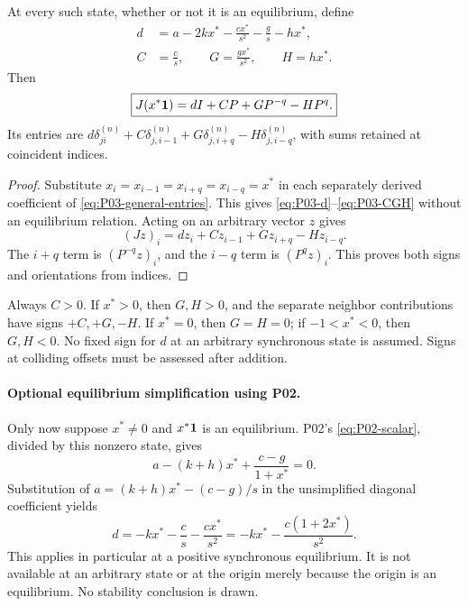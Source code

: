\begin{proposition}
\label{prop:P03-homogeneous}
At every such state, whether or not it is an equilibrium, define
\begin{align}
 d&=a-2kx^*-\frac{c x^*}{s^2}-\frac{g}{s}-h x^*,
       \label{eq:P03-d}\\
 C&=\frac{c}{s},\qquad G=\frac{g x^*}{s^2},\qquad H=h x^*.
       \label{eq:P03-CGH}
\end{align}
Then
\begin{equation}
 \boxed{J(x^*\mathbf{1})=dI+CP+GP^{-q}-HP^q.}
 \label{eq:P03-homogeneous}
\end{equation}
Its entries are
$d\delta^{(n)}_{ji}+C\delta^{(n)}_{j,i-1}
+G\delta^{(n)}_{j,i+q}-H\delta^{(n)}_{j,i-q}$,
with sums retained at coincident indices.
\end{proposition}
\begin{proof}
Substitute $x_i=x_{i-1}=x_{i+q}=x_{i-q}=x^*$ in each separately
 derived coefficient of \eqref{eq:P03-general-entries}. This gives
\eqref{eq:P03-d}--\eqref{eq:P03-CGH} without an equilibrium relation.
Acting on an arbitrary vector $z$ gives
\[
 (Jz)_i=d z_i+C z_{i-1}+G z_{i+q}-H z_{i-q}.
\]
The $i+q$ term is $(P^{-q}z)_i$, and the $i-q$ term is
$(P^qz)_i$. This proves both signs and orientations from indices.
\end{proof}

Always $C>0$. If $x^*>0$, then $G,H>0$, and the separate
neighbor contributions have signs $+C,+G,-H$. If $x^*=0$,
then $G=H=0$; if $-1<x^*<0$, then $G,H<0$.
No fixed sign for $d$ at an arbitrary synchronous state is assumed.
Signs at colliding offsets must be assessed after addition.

\paragraph{Optional equilibrium simplification using P02.}
Only now suppose $x^*\ne0$ and $x^*\mathbf{1}$ is an equilibrium.
P02's \eqref{eq:P02-scalar}, divided by this nonzero state, gives
\begin{equation}
 a-(k+h)x^*+\frac{c-g}{1+x^*}=0.
 \label{eq:P03-equilibrium-relation}
\end{equation}
Substitution of $a=(k+h)x^*-(c-g)/s$ in the unsimplified
 diagonal coefficient yields
\begin{equation}
 d=-k x^*-\frac{c}{s}-\frac{c x^*}{s^2}
   =-k x^*-\frac{c(1+2x^*)}{s^2}.
 \label{eq:P03-equilibrium-d}
\end{equation}
This applies in particular at a positive synchronous equilibrium.
It is not available at an arbitrary state or at the origin merely
because the origin is an equilibrium. No stability conclusion is drawn.

